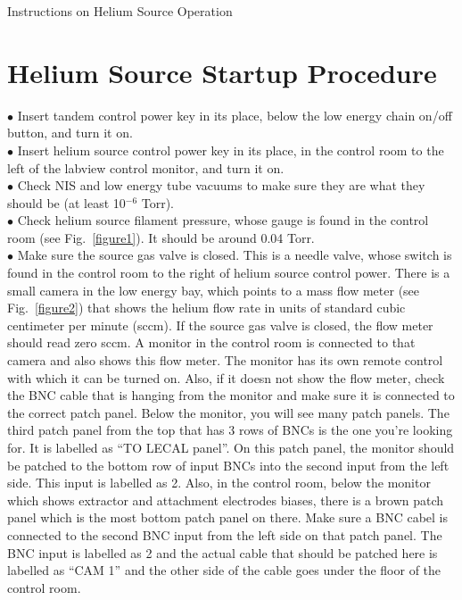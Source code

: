 \documentclass{article}
\begin{document}
\begin{titlepage}\centering
\vspace*{\fill}
\LARGE Instructions on Helium Source Operation
\vspace*{\fill}
\end{titlepage}

\section{Helium Source Startup Procedure}

$\bullet$ Insert tandem control power key in its place, below the low energy chain on/off button, and turn it on.\\
$\bullet$ Insert helium source control power key in its place, in the control room to the left of the labview control monitor, and turn it on.\\
$\bullet$ Check NIS and low energy tube vacuums to make sure they are what they should be (at least 10$^{-6}$ Torr).\\
$\bullet$ Check helium source filament pressure, whose gauge is found in the control room (see Fig.~\ref{figure1}). It should be around 0.04 Torr.\\
$\bullet$ Make sure the source gas valve is closed. This is a needle valve, whose switch is found in the control room to the right of helium source control power. There is a small camera in the low energy bay, which points to a mass flow meter (see Fig.~\ref{figure2}) that shows the helium flow rate in units of standard cubic centimeter per minute (sccm). If the source gas valve is closed, the flow meter should read zero sccm. A monitor in the control room is connected to that camera and also shows this flow meter. The monitor has its own remote control with which it can be turned on. Also, if it doesn not show the flow meter, check the BNC cable that is hanging from the monitor and make sure it is connected to the correct patch panel. Below the monitor, you will see many patch panels. The third patch panel from the top that has 3 rows of BNCs is the one you're looking for. It is labelled as ``TO LECAL panel''. On this patch panel, the monitor should be patched to the bottom row of input BNCs into the second input from the left side. This input is labelled as 2. Also, in the control room, below the monitor which shows extractor and attachment electrodes biases, there is a brown patch panel which is the most bottom patch panel on there. Make sure a BNC cabel is connected to the second BNC input from the left side on that patch panel. The BNC input is labelled as 2 and the actual cable that should be patched here is labelled as ``CAM 1'' and the other side of the cable goes under the floor of the control room.\\
\end{document}
